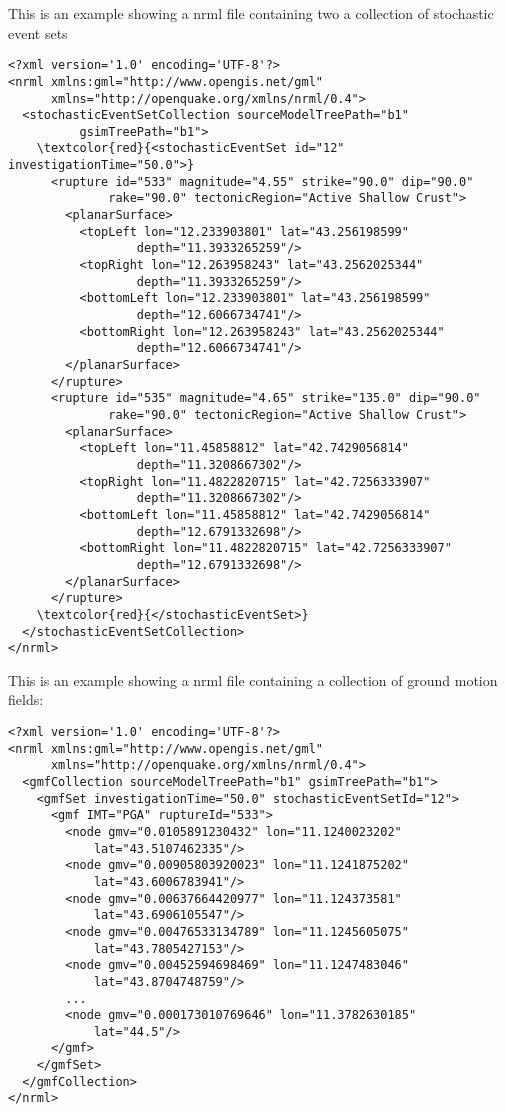 This is an example showing a nrml file containing two a collection of 
stochastic event sets 
\begin{Verbatim}[frame=single, commandchars=\\\{\}, fontsize=\small]
<?xml version='1.0' encoding='UTF-8'?>
<nrml xmlns:gml="http://www.opengis.net/gml" 
	  xmlns="http://openquake.org/xmlns/nrml/0.4">
  <stochasticEventSetCollection sourceModelTreePath="b1" 
          gsimTreePath="b1">
    \textcolor{red}{<stochasticEventSet id="12" investigationTime="50.0">}
      <rupture id="533" magnitude="4.55" strike="90.0" dip="90.0" 
              rake="90.0" tectonicRegion="Active Shallow Crust">
        <planarSurface>
          <topLeft lon="12.233903801" lat="43.256198599" 
                  depth="11.3933265259"/>
          <topRight lon="12.263958243" lat="43.2562025344" 
                  depth="11.3933265259"/>
          <bottomLeft lon="12.233903801" lat="43.256198599" 
                  depth="12.6066734741"/>
          <bottomRight lon="12.263958243" lat="43.2562025344" 
                  depth="12.6066734741"/>
        </planarSurface>
      </rupture>
      <rupture id="535" magnitude="4.65" strike="135.0" dip="90.0" 
              rake="90.0" tectonicRegion="Active Shallow Crust">
        <planarSurface>
          <topLeft lon="11.45858812" lat="42.7429056814" 
                  depth="11.3208667302"/>
          <topRight lon="11.4822820715" lat="42.7256333907" 
                  depth="11.3208667302"/>
          <bottomLeft lon="11.45858812" lat="42.7429056814" 
                  depth="12.6791332698"/>
          <bottomRight lon="11.4822820715" lat="42.7256333907" 
                  depth="12.6791332698"/>
        </planarSurface>
      </rupture>
    \textcolor{red}{</stochasticEventSet>}
  </stochasticEventSetCollection>
</nrml>
\end{Verbatim}
This is an example showing a nrml file containing a collection of
ground motion fields:
\begin{Verbatim}[frame=single, commandchars=\\\{\}, fontsize=\small]
<?xml version='1.0' encoding='UTF-8'?>
<nrml xmlns:gml="http://www.opengis.net/gml" 
      xmlns="http://openquake.org/xmlns/nrml/0.4">
  <gmfCollection sourceModelTreePath="b1" gsimTreePath="b1">
    <gmfSet investigationTime="50.0" stochasticEventSetId="12">
      <gmf IMT="PGA" ruptureId="533">
        <node gmv="0.0105891230432" lon="11.1240023202" 
            lat="43.5107462335"/>
        <node gmv="0.00905803920023" lon="11.1241875202" 
            lat="43.6006783941"/>
        <node gmv="0.00637664420977" lon="11.124373581" 
            lat="43.6906105547"/>
        <node gmv="0.00476533134789" lon="11.1245605075" 
            lat="43.7805427153"/>
        <node gmv="0.00452594698469" lon="11.1247483046" 
            lat="43.8704748759"/>
        ...
        <node gmv="0.000173010769646" lon="11.3782630185" 
            lat="44.5"/>
      </gmf>
    </gmfSet>
  </gmfCollection>
</nrml>
\end{Verbatim}
